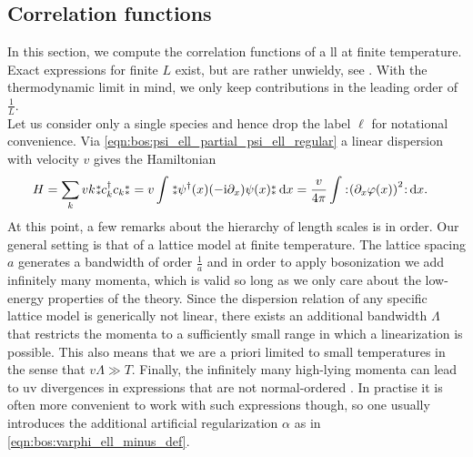 \subsection{Correlation functions}\label{sec:bos:correlators}
In this section, we compute the correlation functions of a \gls{ll} at finite temperature.
Exact expressions for finite $L$ exist, but are rather unwieldy, see \cite{LL_FiniteT_FiniteL_Properties_Mattson_1997}.
With the thermodynamic limit in mind, we only keep contributions in the leading order of $\frac{1}{L}$.\\
Let us consider only a single species and hence drop the label $\ell$ for notational convenience.
Via \autoref{eqn:bos:psi_ell_partial_psi_ell_regular} a linear dispersion with velocity $v$ gives the Hamiltonian
\begin{align}
H &= \sum_k vk\varnormord{c_{k}^\dagger c_k} = v\intx{ }{ }{\varnormord{\psi^\dagger(x) (-\i \partial_x) \psi(x)}}{x} = \frac{v}{4\pi} \intx{ }{ }{\normord{\kla*{\partial_x\varphi(x)}^2}}{x}. \label{eqn:bos:Hamilton vk varnorm nk as 4pi norm dx varphi sqr}
\end{align}
At this point, a few remarks about the hierarchy of length scales is in order.
Our general setting is that of a lattice model at finite temperature.
The lattice spacing $a$ generates a bandwidth of order $\frac{1}{a}$ and in order to apply bosonization we add infinitely many momenta, which is valid so long as we only care about the low-energy properties of the theory.
Since the dispersion relation of any specific lattice model is generically not linear, there exists an additional bandwidth $\Lambda$ that restricts the momenta to a sufficiently small range in which a linearization is possible.
This also means that we are a priori limited to small temperatures in the sense that $v\Lambda \gg T$.
Finally, the infinitely many high-lying momenta can lead to \gls{uv} divergences in expressions that are not normal-ordered \cite[]{Bosonization_DelftSchoeller_1998}. %
In practise it is often more convenient to work with such expressions though, so one usually introduces the additional artificial regularization $\alpha$ as in \autoref{eqn:bos:varphi_ell_minus_def}.\\
